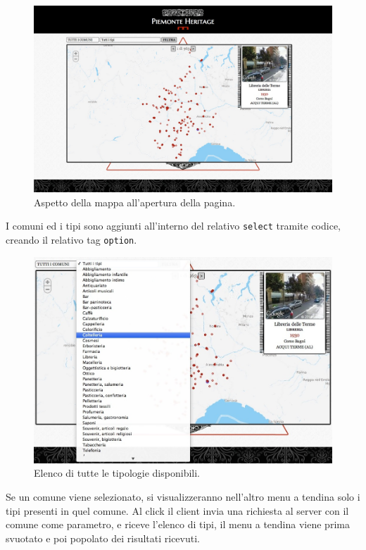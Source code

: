 \begin{figure}[ht!]
	\centering
		\includegraphics[width=\textwidth]{img/s1.jpg}
	\caption{Aspetto della mappa all'apertura della pagina.}
	\label{fig:ini}
\end{figure}

I comuni ed i tipi sono aggiunti all'interno del relativo \texttt{select} tramite codice, creando il relativo tag \texttt{option}.

\begin{figure}[ht!]
	\centering
		\includegraphics[width=\textwidth]{img/s2.jpg}
	\caption{Elenco di tutte le tipologie disponibili.}
	\label{fig:tipo}
\end{figure}

Se un comune viene selezionato, si visualizzeranno nell'altro menu a tendina solo i tipi presenti in quel comune. Al click il client invia una richiesta al server con il comune come parametro, e riceve l'elenco di tipi, il menu a tendina viene prima svuotato e poi popolato dei risultati ricevuti.

